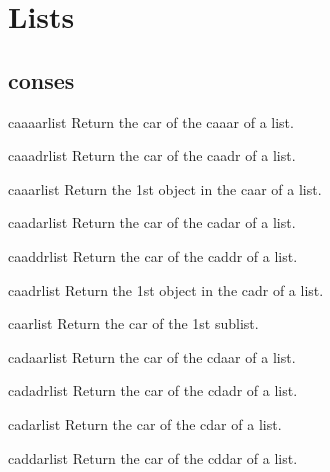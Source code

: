 \chapter{Lists}

\section{conses}

\begin{accessor}{caaaar}{list}{}{}
  Return the car of the caaar of a list.
\end{accessor}

\begin{accessor}{caaadr}{list}{}{}
  Return the car of the caadr of a list.
\end{accessor}

\begin{accessor}{caaar}{list}{}{}
  Return the 1st object in the caar of a list.
\end{accessor}

\begin{accessor}{caadar}{list}{}{}
  Return the car of the cadar of a list.
\end{accessor}

\begin{accessor}{caaddr}{list}{}{}
  Return the car of the caddr of a list.
\end{accessor}

\begin{accessor}{caadr}{list}{}{}
  Return the 1st object in the cadr of a list.
\end{accessor}

\begin{accessor}{caar}{list}{}{}
  Return the car of the 1st sublist.
\end{accessor}

\begin{accessor}{cadaar}{list}{}{}
  Return the car of the cdaar of a list.
\end{accessor}

\begin{accessor}{cadadr}{list}{}{}
  Return the car of the cdadr of a list.
\end{accessor}

\begin{accessor}{cadar}{list}{}{}
  Return the car of the cdar of a list.
\end{accessor}

\begin{accessor}{caddar}{list}{}{}
  Return the car of the cddar of a list.
\end{accessor}

